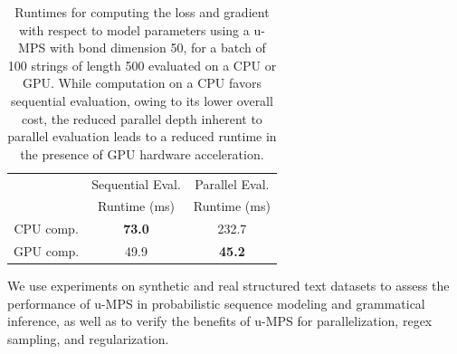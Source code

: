 \begin{table}[t]
\begin{center}
\begin{small}
\begin{sc}
\begin{tabular}{lc|cccc}
\end{tabular}
\end{sc}
\end{small}
\end{center}
\vskip -0.1in
\end{table}
%
\begin{table}[t]
\caption{Runtimes for computing the loss and gradient with respect to model parameters using a u-MPS with bond dimension 50, for a batch of 100 strings of length 500 evaluated on a CPU or GPU. While computation on a CPU favors sequential evaluation, owing to its lower overall cost, the reduced parallel depth inherent to parallel evaluation leads to a reduced runtime in the presence of GPU hardware acceleration.}
\label{tab:runtime}
\renewcommand{\arraystretch}{1.1}
\begin{center}
\begin{small}
\begin{sc}
\begin{tabular}{c|cc}
          & Sequential Eval. & Parallel Eval.   \\
          & Runtime (ms)     & Runtime (ms) \\
\hline
CPU comp. & \textbf{73.0}    & 232.7 \\
GPU comp. & 49.9             & \textbf{45.2}  \\
\end{tabular}
\end{sc}
\end{small}
\end{center}
\vskip -0.1in
\end{table}

We use experiments on synthetic and real structured text datasets to assess the performance of u-MPS in probabilistic sequence modeling and grammatical inference, as well as to verify the benefits of u-MPS for parallelization, regex sampling, and regularization. 

